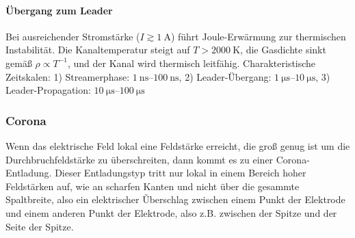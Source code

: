 \paragraph{Übergang zum Leader}
Bei ausreichender Stromstärke ($I \gtrsim \SI{1}{\ampere}$) führt Joule-Erwärmung zur thermischen Instabilität. Die Kanaltemperatur steigt auf $T > \SI{2000}{\kelvin}$, die Gasdichte sinkt gemäß $\rho \propto T^{-1}$, und der Kanal wird thermisch leitfähig. Charakteristische Zeitskalen: 1) Streamerphase: $\SIrange{1}{100}{\nano\second}$, 2) Leader-Übergang: $\SIrange{1}{10}{\micro\second}$, 3) Leader-Propagation: $\SIrange{10}{100}{\micro\second}$

\subsubsection{Corona}
Wenn das elektrische Feld lokal eine Feldstärke erreicht, die groß genug ist um die Durchbruchfeldstärke zu überschreiten, dann kommt es zu einer Corona-Entladung. Dieser Entladungstyp tritt nur lokal in einem Bereich hoher Feldstärken auf, wie an scharfen Kanten und nicht über die gesammte Spaltbreite, also ein elektrischer Ǔberschlag zwischen einem Punkt der Elektrode und einem anderen Punkt der Elektrode, also z.B. zwischen der Spitze und der Seite der Spitze.
